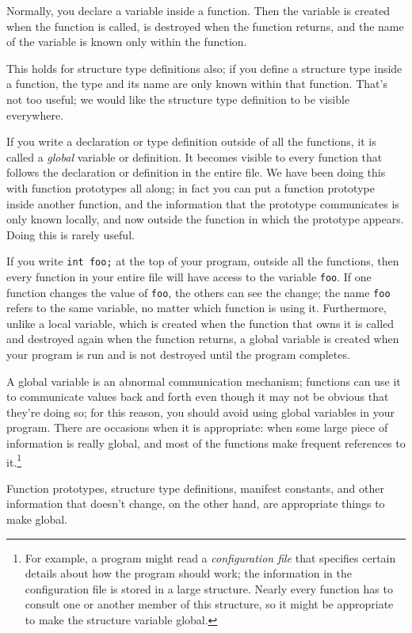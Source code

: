 Normally, you declare a variable inside a function.  Then the variable
is created when the function is called, is destroyed when the function
returns, and the name of the variable is known only within the function.

This holds for structure type definitions also; if you define a
structure type inside a function, the type and its name are only known
within that function.  That's not too useful; we would like the
structure type definition to be visible everywhere.

If you write a declaration or type definition outside of all the
functions, it is called a {\em global}\/ variable or definition.  It
becomes visible to every function that follows the declaration or
definition in the entire file.  We have been doing this with function
prototypes all along; in fact you can put a function prototype inside
another function, and the information that the prototype communicates is
only known locally, and now outside the function in which the prototype
appears.  Doing this is rarely useful.

If you write {\tt int foo;} at the top of your program, outside all the
functions, then every function in your entire file will have access to
the variable {\tt foo}.  If one function changes the value of {\tt foo},
the others can see the change; the name {\tt foo} refers to the same
variable, no matter which function is using it.  Furthermore, unlike a
local variable, which is created when the function that owns it is
called and destroyed again when the function returns, a global variable
is created when your program is run and is not destroyed until the
program completes.

A global variable is an abnormal communication mechanism; functions can
use it to communicate values back and forth even though it may not be
obvious that they're doing so; for this reason, you should avoid using
global variables in your program.  There are occasions when it is
appropriate: when some large piece of information is really global, and
most of the functions make frequent references to it.\footnote{For
example, a program might read a {\em configuration file} that specifies
certain details about how the program should work; the information in
the configuration file is stored in a large structure.  Nearly every
function has to consult one or another member of this structure, so it
might be appropriate to make the structure variable global.}

Function prototypes, structure type definitions, manifest constants, and
other information that doesn't change, on the other hand, are
appropriate things to make global.

